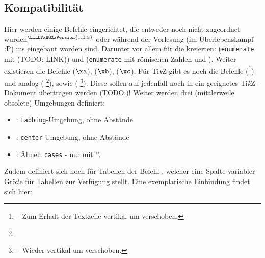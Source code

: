 \subsection[Kompatibilität \LILLYxBOXxVersion{\small 1.0.3}]{Kompatibilität}
{\centering {}\vspace*{0.5\baselineskip}\par}
Hier werden einige Befehle eingerichtet, die entweder noch nicht zugeordnet wurden\({}^{\tiny \LILLYxBOXxVersion{\tiny 1.0.3}}\) oder während der Vorlesung (im Überlebenskampf :P) ins  eingebaut worden sind. 
Darunter vor allem für die \la kreierten:  (\verb|enumerate| mit  (TODO: LINK)) und  (\verb|enumerate| mit römischen Zahlen und ). \medskip\newline
Weiter existieren die Befehle  ($\xa$),  ($\xb$),  ($\xc$). \medskip\newline
Für Ti\textit{k}Z gibt es noch die Befehle  (\footnote{ -- Zum Erhalt der Textzeile vertikal um  verschoben.}) und analog  ( \footnote{}), sowie  ( \footnote{ -- Wieder vertikal um  verschoben.}). Diese sollen auf jedenfall noch in ein geeignetes Ti\textit{k}Z-Dokument übertragen werden (TODO:)!\newline\marginpar{}%
Weiter werden drei (mittlerweile obsolete) Umgebungen definiert: \begin{itemize}[label=$\diamond$]\narrowitems
    \item {}:  \verb|tabbing|-Umgebung, ohne Abstände
    \item {}: \verb|center|-Umgebung, ohne Abstände
    \item {}: Ähnelt \verb|cases| - nur mit '\T{]}'.
\end{itemize}
Zudem definiert sich noch für Tabellen der Befehl , welcher eine Spalte variabler Größe für Tabellen zur Verfügung stellt. Eine exemplarische Einbindung findet sich hier:
